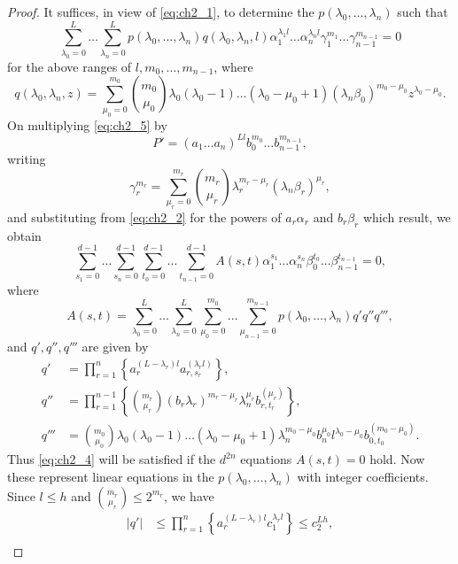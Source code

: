 \begin{proof}
It suffices, in view of \eqref{eq:ch2_1}, to determine the $p(\lambda_0, \dots, \lambda_n)$ such that
\begin{equation} \label{eq:ch2_5}\tag{5}
\sum_{\lambda_0=0}^L \dots \sum_{\lambda_n=0}^L p(\lambda_0, \dots, \lambda_n) q(\lambda_0, \lambda_n, l) \alpha_1^{\lambda_1 l} \dots \alpha_n^{\lambda_n l} \gamma_1^{m_1} \dots \gamma_{n-1}^{m_{n-1}} = 0
\end{equation}
for the above ranges of $l, m_0, \dots, m_{n-1}$, where
\[
q(\lambda_0, \lambda_n, z) = \sum_{\mu_0=0}^{m_0} \binom{m_0}{\mu_0} \lambda_0(\lambda_0 - 1) \dots (\lambda_0 - \mu_0 + 1) (\lambda_n \beta_0)^{m_0 - \mu_0} z^{\lambda_0 - \mu_0}.
\]
On multiplying \eqref{eq:ch2_5} by
\begin{equation} \label{eq:ch2_6}\tag{6}
P' = (a_1 \dots a_n)^{Ll} b_0^{m_0} \dots b_{n-1}^{m_{n-1}},
\end{equation}
writing
\[
\gamma_r^{m_r} = \sum_{\mu_r=0}^{m_r} \binom{m_r}{\mu_r} \lambda_r^{m_r-\mu_r} (\lambda_n \beta_r)^{\mu_r},
\]
and substituting from \eqref{eq:ch2_2} for the powers of $a_r \alpha_r$ and $b_r \beta_r$ which result, we obtain
\[
\sum_{s_1=0}^{d-1} \dots \sum_{s_n=0}^{d-1} \sum_{t_0=0}^{d-1} \dots \sum_{t_{n-1}=0}^{d-1} A(s,t) \alpha_1^{s_1} \dots \alpha_n^{s_n} \beta_0^{t_0} \dots \beta_{n-1}^{t_{n-1}} = 0,
\]
where
\[
A(s,t) = \sum_{\lambda_0=0}^L \dots \sum_{\lambda_n=0}^L \sum_{\mu_0=0}^{m_0} \dots \sum_{\mu_{n-1}=0}^{m_{n-1}} p(\lambda_0, \dots, \lambda_n) q' q'' q''',
\]
and $q', q'', q'''$ are given by
\begin{align*}
q' &= \prod_{r=1}^n \left\{ a_r^{(L-\lambda_r)l} a_{r,s_r}^{(\lambda_r l)} \right\}, \\
q'' &= \prod_{r=1}^{n-1} \left\{ \binom{m_r}{\mu_r} (b_r \lambda_r)^{m_r-\mu_r} \lambda_n^{\mu_r} b_{r,t_r}^{(\mu_r)} \right\}, \\
q''' &= \binom{m_0}{\mu_0} \lambda_0(\lambda_0-1) \dots (\lambda_0-\mu_0+1) \lambda_n^{m_0-\mu_0} b_n^{\mu_0} l^{\lambda_0-\mu_0} b_{0,t_0}^{(m_0-\mu_0)}.
\end{align*}
Thus \eqref{eq:ch2_4} will be satisfied if the $d^{2n}$ equations $A(s,t)=0$ hold. Now these represent linear equations in the $p(\lambda_0, \dots, \lambda_n)$ with integer coefficients.
Since $l \le h$ and $\binom{m_r}{\mu_r} \le 2^{m_r}$, we have
\begin{align*}
|q'| &\le \prod_{r=1}^n \left\{ a_r^{(L-\lambda_r)l} c_1^{\lambda_r l} \right\} \le c_2^{Lh}, \\

\end{align*}
\end{proof}
